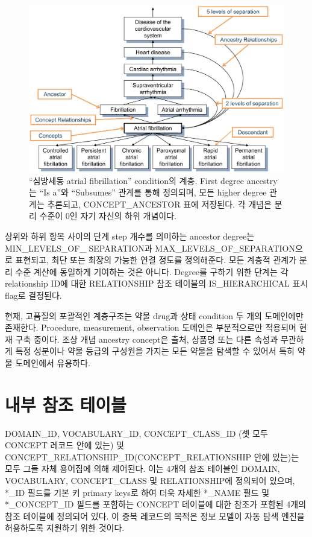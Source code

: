 \documentclass[10.5pt]{book}
\theoremstyle{definition}
\theoremstyle{definition}
\theoremstyle{definition}
\theoremstyle{remark}
\begin{document}
\begin{figure}

{\centering \includegraphics[width=1\linewidth]{images/StandardizedVocabularies/conceptAncestor} 

}

\caption{``심방세동 atrial fibrillation'' condition의 계층. First
degree ancestry는 ``Is a''와 ``Subsumes'' 관계를 통해 정의되며, 모든
higher degree 관계는 추론되고, CONCEPT\_ANCESTOR 표에 저장된다. 각
개념은 분리 수준이 0인 자기 자신의 하위 개념이다.
}\label{fig:conceptAncestor}
\end{figure}

상위와 하위 항목 사이의 단계 step 개수를 의미하는 ancestor degree는
MIN\_LEVELS\_OF\_ SEPARATION과 MAX\_LEVELS\_OF\_SEPARATION으로 표현되고,
최단 또는 최장의 가능한 연결 정도를 정의해준다. 모든 계층적 관계가 분리
수준 계산에 동일하게 기여하는 것은 아니다. Degree를 구하기 위한 단계는
각 relationship ID에 대한 RELATIONSHIP 참조 테이블의 IS\_HIERARCHICAL
표시 flag로 결정된다.

현재, 고품질의 포괄적인 계층구조는 약물 drug과 상태 condition 두 개의
도메인에만 존재한다. Procedure, measurement, observation 도메인은
부분적으로만 적용되며 현재 구축 중이다. 조상 개념 ancestry concept은
출처, 상품명 또는 다른 속성과 무관하게 특정 성분이나 약물 등급의
구성원을 가지는 모든 약물을 탐색할 수 있어서 특히 약물 도메인에서
유용하다.

\section{내부 참조 테이블}\label{--}

DOMAIN\_ID, VOCABULARY\_ID, CONCEPT\_CLASS\_ID (셋 모두 CONCEPT 레코드
안에 있는) 및 CONCEPT\_RELATIONSHIP\_ID(CONCEPT\_RELATIONSHIP 안에
있는)는 모두 그들 자체 용어집에 의해 제어된다. 이는 4개의 참조 테이블인
DOMAIN, VOCABULARY, CONCEPT\_CLASS 및 RELATIONSHIP에 정의되어 있으며,
*\_ID 필드를 기본 키 primary keys로 하여 더욱 자세한 *\_NAME 필드 및
*\_CONCEPT\_ID 필드를 포함하는 CONCEPT 테이블에 대한 참조가 포함된 4개의
참조 테이블에 정의되어 있다. 이 중복 레코드의 목적은 정보 모델이 자동
탐색 엔진을 허용하도록 지원하기 위한 것이다.
\end{document}
